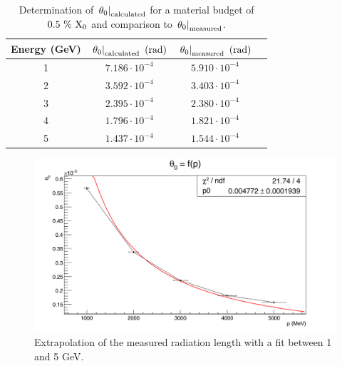    \begin{table}
     \centering
     \begin{tabular}{c c c c}
        \hline %
        Energy (GeV)	& $\left. \theta_0\right|_{\rm{calculated}}~(\rm{rad})$ & $\left. \theta_0\right|_{\rm{measured}}~(\rm{rad})$ \tabularnewline
        \hline %
        \hline %

        	1	  &		$7.186\cdot 10^{-4}$	  &		$5.910\cdot 10^{-4}$	    \tabularnewline
        	2		&		$3.592\cdot 10^{-4}$	  &		$3.403\cdot 10^{-4}$	     \tabularnewline
        	3		&		$2.395\cdot 10^{-4}$	  &		$2.380\cdot 10^{-4}$      \tabularnewline
        	4		&		$1.796\cdot 10^{-4}$	  &	  $1.821\cdot 10^{-4}$       \tabularnewline
        	5		&		$1.437\cdot 10^{-4}$    &		$1.544\cdot 10^{-4}$	     \tabularnewline
     
     \end{tabular}
     \caption{Determination of $\left. \theta_0\right|_{\rm{calculated}}$ for a material budget of $0.5~\%~\rm{X_0}$ and comparison to $\left. \theta_0\right|_{\rm{measured}}$.}
     \label{tab:theta0Calcultation}
   \end{table}

   \begin{figure}[!h]
     \centering
     \includegraphics[width = \textwidth]{Pictures/X0/theta0VsP_all.png}
     \caption{Extrapolation of the measured radiation length with a fit between 1 and 5 GeV.}
     \label{fig:theta0vsP_all}
   \end{figure}


